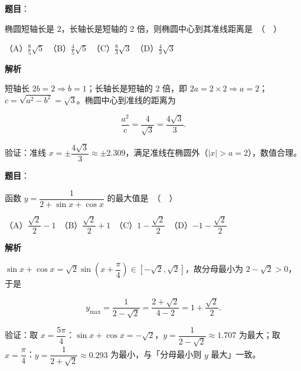 \begin{answer}

\textbf{题目}：

椭圆短轴长是 2，长轴长是短轴的 2 倍，则椭圆中心到其准线距离是　（　）

（A）$\frac{8}{5}\sqrt{5}$　（B）$\frac{4}{5}\sqrt{5}$　（C）$\frac{8}{3}\sqrt{3}$　（D）$\frac{4}{3}\sqrt{3}$

\textbf{解析}

短轴长 $2b=2\Rightarrow b=1$；长轴长是短轴的 2 倍，即 $2a=2\times2\Rightarrow a=2$；$c=\sqrt{a^2-b^2}=\sqrt3$。椭圆中心到准线的距离为

\nopagebreak[4]
\[\frac{a^2}{c}=\frac{4}{\sqrt3}=\frac{4\sqrt3}{3}.\]

验证：准线 $x=\pm\dfrac{4\sqrt3}{3}\approx\pm2.309$，满足准线在椭圆外（$|x|>a=2$），数值合理。


\par\medskip

\end{answer}
\begin{answer}

\textbf{题目}：

函数 $y = \dfrac{1}{2 + \sin x + \cos x}$ 的最大值是　（　）

（A）$\dfrac{\sqrt{2}}{2} - 1$　（B）$\dfrac{\sqrt{2}}{2} + 1$　（C）$1 - \dfrac{\sqrt{2}}{2}$　（D）$-1 - \dfrac{\sqrt{2}}{2}$

\textbf{解析}

$\sin x+\cos x=\sqrt2\sin\!\left(x+\dfrac\pi4\right)\in[-\sqrt2,\sqrt2]$，故分母最小为 $2-\sqrt2>0$，于是

\nopagebreak[4]
\[y_{\max}=\frac{1}{2-\sqrt2}=\frac{2+\sqrt2}{4-2}=1+\frac{\sqrt2}{2}.\]

验证：取 $x=\dfrac{5\pi}{4}$：$\sin x+\cos x=-\sqrt2$，$y=\dfrac{1}{2-\sqrt2}\approx1.707$ 为最大；取 $x=\dfrac{\pi}{4}$：$y=\dfrac{1}{2+\sqrt2}\approx0.293$ 为最小，与「分母最小则 $y$ 最大」一致。


\par\medskip

\end{answer}
